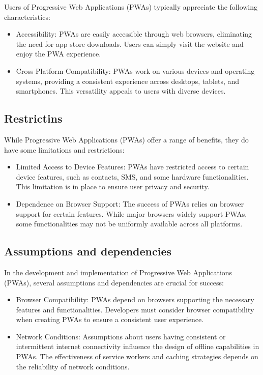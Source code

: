 \documentclass[12pt,a4paper, twosite]{article}
\begin{document}
Users of Progressive Web Applications (PWAs) typically appreciate the following characteristics:

\begin{itemize}
  \item Accessibility: PWAs are easily accessible through web browsers, eliminating the need for app store downloads. Users can simply visit the website and enjoy the PWA experience.

  \item Cross-Platform Compatibility: PWAs work on various devices and operating systems, providing a consistent experience across desktops, tablets, and smartphones. This versatility appeals to users with diverse devices.
\end{itemize}


\subsection{Restrictins}
\label{sec:org5ca5790}

While Progressive Web Applications (PWAs) offer a range of benefits, they do have some limitations and restrictions:

\begin{itemize}
  

  \item Limited Access to Device Features: PWAs have restricted access to certain device features, such as contacts, SMS, and some hardware functionalities. This limitation is in place to ensure user privacy and security.

  \item Dependence on Browser Support: The success of PWAs relies on browser support for certain features. While major browsers widely support PWAs, some functionalities may not be uniformly available across all platforms.

\end{itemize}


\subsection{Assumptions and dependencies}
\label{sec:org0ae23fe}

In the development and implementation of Progressive Web Applications (PWAs), several assumptions and dependencies are crucial for success:

\begin{itemize}
  \item Browser Compatibility: PWAs depend on browsers supporting the necessary features and functionalities. Developers must consider browser compatibility when creating PWAs to ensure a consistent user experience.
  
  \item Network Conditions: Assumptions about users having consistent or intermittent internet connectivity influence the design of offline capabilities in PWAs. The effectiveness of service workers and caching strategies depends on the reliability of network conditions.
\end{itemize}
\end{document}
